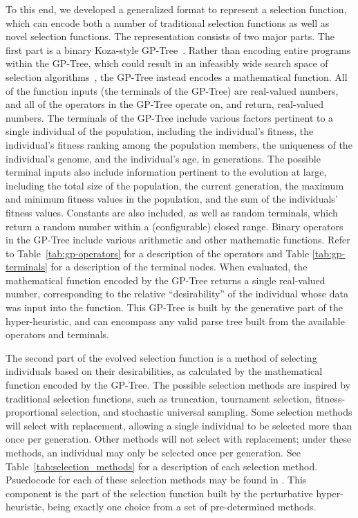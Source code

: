 \documentclass[sigconf]{acmart}
\begin{document}
To this end, we developed a generalized format to represent a selection function, which can encode both a number of traditional selection functions as well as novel selection functions. The representation consists of two major parts. The first part is a binary Koza-style GP-Tree~\citep{koza1994genetic}. Rather than encoding entire programs within the GP-Tree, which could result in an infeasibly wide search space of selection algorithms~\citep{woodward2009GPNotGood}, the GP-Tree instead encodes a mathematical function. All of the function inputs (the terminals of the GP-Tree) are real-valued numbers, and all of the operators in the GP-Tree operate on, and return, real-valued numbers. The terminals of the GP-Tree include various factors pertinent to a single individual of the population, including the individual's fitness, the individual's fitness ranking among the population members, the uniqueness of the individual's genome, and the individual's age, in generations. The possible terminal inputs also include information pertinent to the evolution at large, including the total size of the population, the current generation, the maximum and minimum fitness values in the population, and the sum of the individuals' fitness values. Constants are also included, as well as random terminals, which return a random number within a (configurable) closed range. Binary operators in the GP-Tree include various arithmetic and other mathematic functions. Refer to Table~\ref{tab:gp-operators} for a description of the operators and Table \ref{tab:gp-terminals} for a description of the terminal nodes. When evaluated, the mathematical function encoded by the GP-Tree returns a single real-valued number, corresponding to the relative ``desirability'' of the individual whose data was input into the function. This GP-Tree is built by the generative part of the hyper-heuristic, and can encompass any valid parse tree built from the available operators and terminals.

The second part of the evolved selection function is a method of selecting individuals based on their desirabilities, as calculated by the mathematical function encoded by the GP-Tree. The possible selection methods are inspired by traditional selection functions, such as truncation, tournament selection, fitness-proportional selection, and stochastic universal sampling. Some selection methods will select with replacement, allowing a single individual to be selected more than once per generation. Other methods will not select with replacement; under these methods, an individual may only be selected once per generation. See Table~\ref{tab:selection_methods} for a description of each selection method. Psuedocode for each of these selection methods may be found in \citep{richter2019thesis}. This component is the part of the selection function built by the perturbative hyper-heuristic, being exactly one choice from a set of pre-determined methods.
\end{document}
